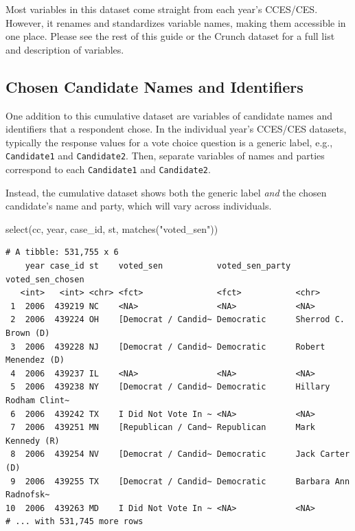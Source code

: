 \documentclass[10pt,article,oneside]{memoir}
\theoremstyle{definition}
\newenvironment{Shaded}{\begin{snugshade}}{\end{snugshade}}
\newcommand{\FunctionTok}[1]{\textcolor[rgb]{0.00,0.00,0.00}{#1}}
\newcommand{\NormalTok}[1]{#1}
\newcommand{\StringTok}[1]{\textcolor[rgb]{0.31,0.60,0.02}{#1}}
\begin{document}
Most variables in this dataset come straight from each year's CCES/CES.
However, it renames and standardizes variable names, making them
accessible in one place. Please see the rest of this guide or the Crunch
dataset for a full list and description of variables.

\hypertarget{chosen-candidate-names-and-identifiers}{%
\subsection{Chosen Candidate Names and
Identifiers}\label{chosen-candidate-names-and-identifiers}}

One addition to this cumulative dataset are variables of candidate names
and identifiers that a respondent chose. In the individual year's
CCES/CES datasets, typically the response values for a vote choice
question is a generic label, e.g., \texttt{Candidate1} and
\texttt{Candidate2}. Then, separate variables of names and parties
correspond to each \texttt{Candidate1} and \texttt{Candidate2}.

Instead, the cumulative dataset shows both the generic label \emph{and}
the chosen candidate's name and party, which will vary across
individuals.

\begin{Shaded}
\begin{Highlighting}[]
\FunctionTok{select}\NormalTok{(cc, year, case\_id, st, }\FunctionTok{matches}\NormalTok{(}\StringTok{"voted\_sen"}\NormalTok{))}
\end{Highlighting}
\end{Shaded}

\begin{verbatim}
# A tibble: 531,755 x 6
    year case_id st    voted_sen           voted_sen_party voted_sen_chosen     
   <int>   <int> <chr> <fct>               <fct>           <chr>                
 1  2006  439219 NC    <NA>                <NA>            <NA>                 
 2  2006  439224 OH    [Democrat / Candid~ Democratic      Sherrod C. Brown (D) 
 3  2006  439228 NJ    [Democrat / Candid~ Democratic      Robert Menendez (D)  
 4  2006  439237 IL    <NA>                <NA>            <NA>                 
 5  2006  439238 NY    [Democrat / Candid~ Democratic      Hillary Rodham Clint~
 6  2006  439242 TX    I Did Not Vote In ~ <NA>            <NA>                 
 7  2006  439251 MN    [Republican / Cand~ Republican      Mark Kennedy (R)     
 8  2006  439254 NV    [Democrat / Candid~ Democratic      Jack Carter (D)      
 9  2006  439255 TX    [Democrat / Candid~ Democratic      Barbara Ann Radnofsk~
10  2006  439263 MD    I Did Not Vote In ~ <NA>            <NA>                 
# ... with 531,745 more rows
\end{verbatim}
\end{document}
